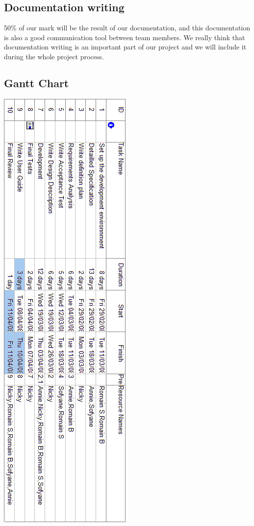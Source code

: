 \documentclass[a4paper,12pt]{article}
\begin{document}
\subsection{Documentation writing}
50\% of our mark will be the result of our documentation, and this documentation is also a good communication tool between team members.
We really think that documentation writing is an important part of our project and we will include it during the whole project process.
\newpage
\subsection{Gantt Chart}
\begin{center}
\includegraphics[scale=0.7]{ressources.png}
\end{center}
\end{document}
